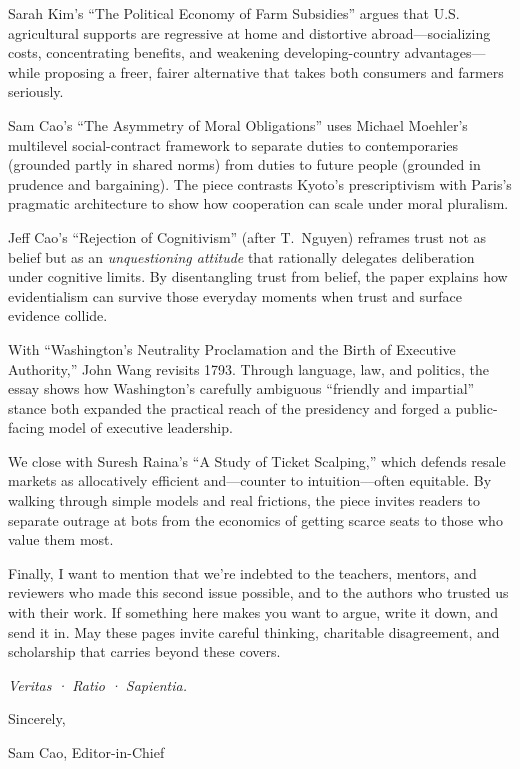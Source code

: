 \documentclass[12pt, a4paper, openany]{book}
\begin{document}
Sarah Kim’s “The Political Economy of Farm Subsidies” argues that U.S. agricultural supports are regressive at home and distortive abroad—socializing costs, concentrating benefits, and weakening developing-country advantages—while proposing a freer, fairer alternative that takes both consumers and farmers seriously.

Sam Cao’s “The Asymmetry of Moral Obligations” uses Michael Moehler’s multilevel social-contract framework to separate duties to contemporaries (grounded partly in shared norms) from duties to future people (grounded in prudence and bargaining). The piece contrasts Kyoto’s prescriptivism with Paris’s pragmatic architecture to show how cooperation can scale under moral pluralism.

Jeff Cao’s “Rejection of Cognitivism” (after T.\ Nguyen) reframes trust not as belief but as an \emph{unquestioning attitude} that rationally delegates deliberation under cognitive limits. By disentangling trust from belief, the paper explains how evidentialism can survive those everyday moments when trust and surface evidence collide.

With “Washington’s Neutrality Proclamation and the Birth of Executive Authority,” John Wang revisits 1793. Through language, law, and politics, the essay shows how Washington’s carefully ambiguous “friendly and impartial” stance both expanded the practical reach of the presidency and forged a public-facing model of executive leadership.

We close with Suresh Raina’s “A Study of Ticket Scalping,” which defends resale markets as allocatively efficient and—counter to intuition—often equitable. By walking through simple models and real frictions, the piece invites readers to separate outrage at bots from the economics of getting scarce seats to those who value them most.

Finally, I want to mention that we’re indebted to the teachers, mentors, and reviewers who made this second issue possible, and to the authors who trusted us with their work. If something here makes you want to argue, write it down, and send it in. May these pages invite careful thinking, charitable disagreement, and scholarship that carries beyond these covers.

\medskip
\emph{Veritas · Ratio · Sapientia.}

\medskip

\noindent Sincerely,

 Sam Cao, Editor-in-Chief

\tableofcontents
\end{document}
